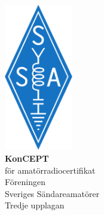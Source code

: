 \thispagestyle{empty}



\onecolumn
\vspace*{3cm}
\begin{center}
\includegraphics[width=3cm]{images/ssa-logotyp.pdf} \\
\vspace*{2cm}
  \sf
{\fontsize{2.4cm}{2.88cm}\bfseries{KonCEPT}} \\[2ex]
\Large{för amatörradiocertifikat} \\[2ex]
\huge{Föreningen} \\
\huge{Sveriges Sändareamatörer} \\[1cm]
\Large{Tredje upplagan} \\
\end{center}
\twocolumn

\clearpage
